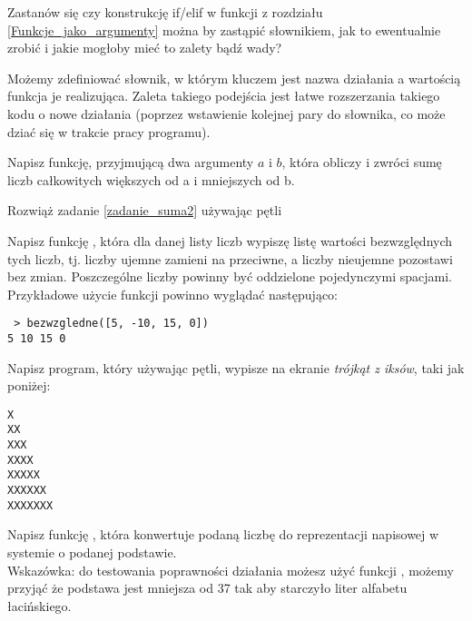 
\dbEntryCheckResults
Zastanów się czy konstrukcję if/elif w funkcji  z rozdziału \ref{Funkcje_jako_argumenty} można by zastąpić słownikiem, jak to ewentualnie zrobić i jakie mogłoby mieć to zalety bądź wady?
\fi

\dbEntryCheckResults
Możemy zdefiniować słownik, w którym kluczem jest nazwa działania a wartością funkcja je realizująca.
Zaleta takiego podejścia jest łatwe rozszerzania takiego kodu o nowe działania (poprzez wstawienie kolejnej pary do słownika, co może dziać się w trakcie pracy programu).
\fi


\dbEntryCheckResults
Napisz funkcję, przyjmującą dwa argumenty $a$ i $b$, która obliczy i zwróci sumę liczb całkowitych większych od a i mniejszych od b.
\fi

\dbEntryCheckResults
Rozwiąż zadanie \ref{zadanie_suma2} używając pętli 
\fi

\dbEntryCheckResults
Napisz funkcję , która dla danej listy liczb wypiszę listę wartości bezwzględnych
tych liczb, tj. liczby ujemne zamieni na przeciwne, a liczby nieujemne pozostawi bez zmian.
Poszczególne liczby powinny być oddzielone pojedynczymi spacjami.
Przykładowe użycie funkcji powinno wyglądać następująco:
\begin{Verbatim}
 > bezwzgledne([5, -10, 15, 0])
5 10 15 0
\end{Verbatim}
\fi

\dbEntryCheckResults
Napisz program, który używając pętli, wypisze na ekranie \textit{trójkąt z iksów}, taki jak poniżej:
\begin{Verbatim}
X
XX
XXX
XXXX
XXXXX
XXXXXX
XXXXXXX
\end{Verbatim}
\fi

\dbEntryCheckResults
Napisz funkcję , która konwertuje podaną liczbę do reprezentacji napisowej w systemie o podanej podstawie.\\
Wskazówka: do testowania poprawności działania możesz użyć funkcji , możemy przyjąć że podstawa jest mniejsza od 37 tak aby starczyło liter alfabetu łacińskiego.
\fi

